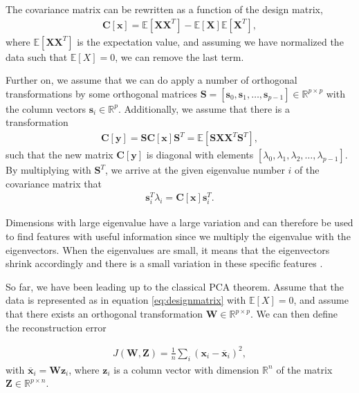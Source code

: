 \noindent The covariance matrix can be rewritten as a function of the design matrix,
\begin{align}
  \boldsymbol{C}[\boldsymbol{x}] = \mathbb{E}[\boldsymbol{X}\boldsymbol{X}^T] - \mathbb{E}[\boldsymbol{X}] \mathbb{E}[\boldsymbol{X}^T],
\end{align}
where $\mathbb{E}[\boldsymbol{X}\boldsymbol{X}^T]$ is the expectation value, and assuming we have normalized the data such that $\mathbb{E}[X] = 0$, we can remove the last term.

Further on, we assume that we can do apply a number of orthogonal transformations by some orthogonal matrices $\boldsymbol{S}=[\boldsymbol{s}_0,\boldsymbol{s}_1,\dots,\boldsymbol{s}_{p-1}]\in {\mathbb{R}}^{p\times p}$ with the column vectors $\boldsymbol{s}_i \in {\mathbb{R}}^{p}$. Additionally, we assume that there is a transformation
\begin{align}
  \boldsymbol{C}[\boldsymbol{y}] =\boldsymbol{S}\boldsymbol{C}[\boldsymbol{x}]\boldsymbol{S}^T = \mathbb{E}[\boldsymbol{S}\boldsymbol{X}\boldsymbol{X}^T\boldsymbol{S}^T],
\end{align}
such that the new matrix $\boldsymbol{C}[\boldsymbol{y}]$ is diagonal with elements $[\lambda_0,\lambda_1,\lambda_2,\dots,\lambda_{p-1}]$. By multiplying with $\boldsymbol{S}^T$, we arrive at the given eigenvalue number $i$ of the covariance matrix that
\begin{align}
  \boldsymbol{s}^T_i\lambda_i = \boldsymbol{C}[\boldsymbol{x}]\boldsymbol{s}^T_i.
\end{align}

Dimensions with large eigenvalue have a large variation and can therefore be used to find features with useful information since we multiply the eigenvalue with the eigenvectors. When the eigenvalues are small, it means that the eigenvectors shrink accordingly and there is a small variation in these specific features \cite{Marsland2014}.

So far, we have been leading up to the classical PCA theorem. Assume that the data is represented as in equation \ref{eq:designmatrix} with $\mathbb{E}[X]=0$, and assume that there exists an orthogonal transformation $\boldsymbol{W}\in {\mathbb{R}}^{p\times p}$. We can then define the reconstruction error

\begin{align}
  J(\boldsymbol{W},\boldsymbol{Z}) = \frac{1}{n}\sum_i (\boldsymbol{x}_i - \overline{\boldsymbol{x}}_i)^2,
\end{align}
with $\overline{\boldsymbol{x}}_i = \boldsymbol{W}\boldsymbol{z}_i$, where $\boldsymbol{z}_i$ is a column vector with dimension ${\mathbb{R}}^{n}$ of the matrix
$\boldsymbol{Z}\in{\mathbb{R}}^{p\times n}$.


